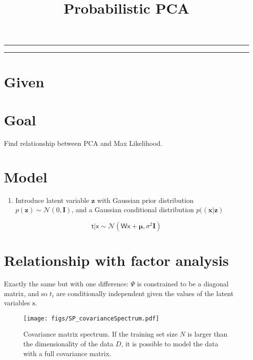
\title{Probabilistic PCA}
\date{}

\maketitle
\rule[0pt]{\textwidth}{1pt}
\tableofcontents
\rule[0pt]{\textwidth}{1pt}

\section{Given}

\section{Goal}
Find relationship between PCA and Max Likelihood.

\section{Model}

\begin{enumerate}
\item Introduce latent variable $\mathbf{z}$ with Gaussian prior distribution $p(\mathbf{z}) \sim \mathcal{N}(0, \mathbf{I})$, and a Gaussian conditional distribution $p((\mathbf{x}|\mathbf{z})$

\end{enumerate}

\begin{equation}
\mathsf{t|x} \sim \mathcal{N}(\mathsf{Wx} + \mathbf{\mu}, \sigma^2\mathbf{I})
\end{equation}


\section{Relationship with factor analysis}
Exactly the same but with one difference: $\Psi$ is constrained to be a diagonal matrix, and so $t_i$ are conditionally independent given the values of the latent variables $\mathsf{x}$.

								\begin{figure}
								\centering
								\texttt{[image: figs/SP\_covarianceSpectrum.pdf]}
								\caption{Covariance matrix spectrum.  If the training set size $N$ is larger than the dimensionality of the data $D$, it is possible to model the data with a full covariance matrix.} 
								\label{fig:covariance_matrix_spectrum}
								\end{figure}

